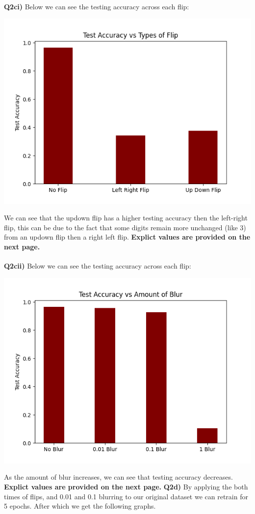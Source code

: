 \documentclass{article}
\begin{document}
\begin{titlepage}
\begin{tabular}{ll}
\end{tabular}
\newpage
\textbf{Q2ci)} Below we can see the testing accuracy across each flip:
\begin{center} \includegraphics[width=0.7\linewidth]{flip.png} 
\end{center}
We can see that the updown flip has a higher testing accuracy then the left-right flip, this can be due to the fact that some digits remain more unchanged (like 3) from an updown flip then a right left flip. \textbf{Explict values are provided on the next page. } \\\\
\textbf{Q2cii)} Below we can see the testing accuracy across each flip:
\begin{center} \includegraphics[width=0.7\linewidth]{blur.png} 
\end{center}
As the amount of blur increases, we can see that testing accuracy decreases. \textbf{Explict values are provided on the next page. }
\newpage
\textbf{Q2d)} By applying the both times of flips, and 0.01 and 0.1 blurring to our original dataset we can retrain for 5 epochs. After which we get the following graphs.\\
\begin{tabular}{ll}


\end{tabular}
\end{titlepage}
\end{document}
